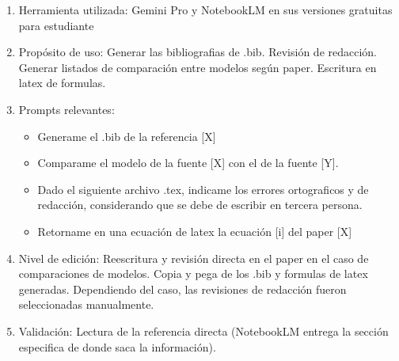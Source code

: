 
\begin{enumerate}
\item Herramienta utilizada: Gemini Pro y NotebookLM en sus versiones gratuitas para estudiante
\item Propósito de uso: Generar las bibliografias de .bib. Revisión de redacción. Generar listados de comparación entre modelos según paper. Escritura en latex de formulas.
\item Prompts relevantes: 
\begin{itemize}
\item Generame el .bib de la referencia [X]
\item Comparame el modelo de la fuente [X] con el de la fuente [Y].
\item Dado el siguiente archivo .tex, indicame los errores ortograficos y de redacción, considerando que se debe de escribir en tercera persona.
\item Retorname en una ecuación de latex la ecuación [i] del paper [X]
\end{itemize}
\item Nivel de edición: Reescritura y revisión directa en el paper en el caso de comparaciones de modelos. Copia y pega de los .bib y formulas de latex generadas. Dependiendo del caso, las revisiones de redacción fueron seleccionadas manualmente.
\item Validación: Lectura de la referencia directa (NotebookLM entrega la sección especifica de donde saca la información).
\end{enumerate}


